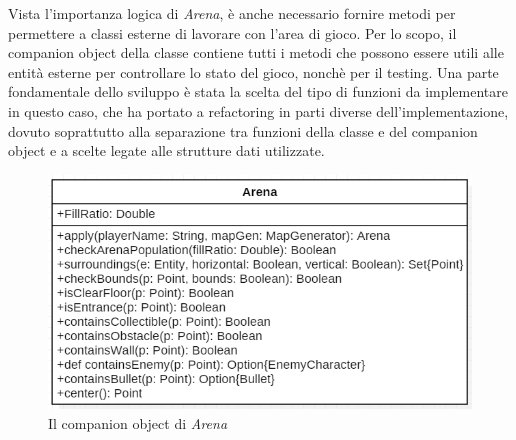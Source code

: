 Vista l'importanza logica di \textit{Arena}, è anche necessario fornire metodi per permettere a classi esterne di lavorare con l'area di gioco. Per lo scopo, il companion object della classe contiene tutti i metodi che possono essere utili alle entità esterne per controllare lo stato del gioco, nonchè per il testing. Una parte fondamentale dello sviluppo è stata la scelta del tipo di funzioni da implementare in questo caso, che ha portato a refactoring in parti diverse dell'implementazione, dovuto soprattutto alla separazione tra funzioni della classe e del companion object e a scelte legate alle strutture dati utilizzate.

\begin{figure}[H]
  \includegraphics[width=14cm]{res/arenaObject.png}
  \caption{Il companion object di \textit{Arena}}
  \label{arenaObject}
\end{figure}